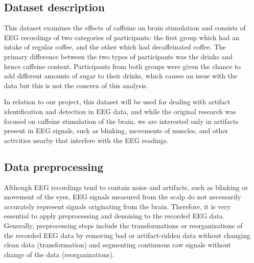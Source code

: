 \documentclass[12pt,a4paper,titlepage,openany]{report}
\begin{document}
\subsection{Dataset description}

This dataset examines the effects of caffeine on brain stimulation and consists of EEG recordings of two categories of participants: the first group which had an intake of regular coffee, and the other which had decaffeinated coffee. 
The primary difference between the two types of participants was the drinks and hence caffeine content. 
Participants from both groups were given the chance to add different amounts of sugar to their drinks, which causes an issue with the data but this is not the concern of this analysis.

In relation to our project, this dataset will be used for dealing with artifact identification and detection in EEG data, and while the original research was focused on caffeine stimulation of the brain, we are interested only in artifacts present in EEG signals, such as blinking, movements of muscles, and other activities nearby that interfere with the EEG readings.

\subsection{Data preprocessing}

Although EEG recordings tend to contain noise and artifacts, such as blinking or movement of the eyes, EEG signals measured from the scalp do not necessarily accurately represent signals originating from the brain. 
Therefore, it is very essential to apply preprocessing and denoising to the recorded EEG data. 
Generally, preprocessing steps include the transformations or reorganizations of the recorded EEG data by removing bad or artifact-ridden data without changing clean data (transformation) and segmenting continuous raw signals without change of the data (reorganizations).
\end{document}
